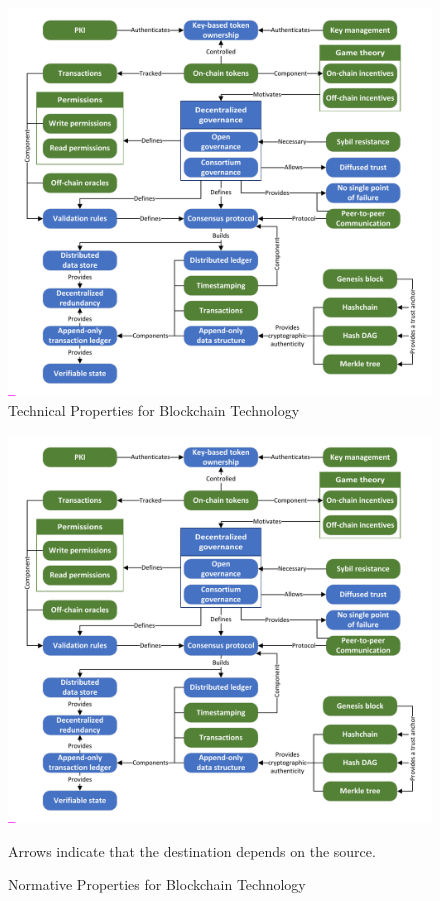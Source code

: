\begin{figure}
	\centering
	\includegraphics[page=2,width=.75\textwidth]{figures/grounded-theory-main}
	
	\caption{Technical Properties for Blockchain Technology}
	\label{fig:technical-properties}
\end{figure}

\begin{figure}
	\centering
	\includegraphics[page=3,width=\columnwidth]{figures/grounded-theory-main}
	
	Arrows indicate that the destination depends on the source.
	\caption{Normative Properties for Blockchain Technology}
	\label{fig:normative-properties}
\end{figure}



